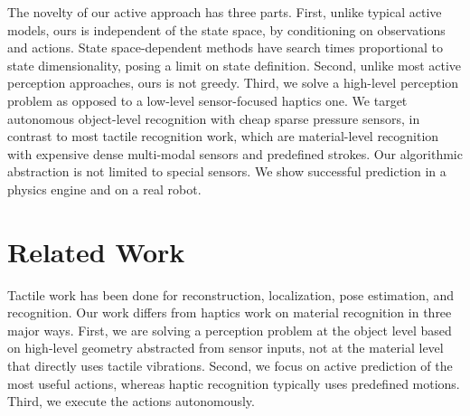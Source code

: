 \documentclass[letterpaper, 10 pt, conference]{ieeeconf}  %
\begin{document}
The novelty of our active approach has three parts. 
First, unlike typical active models, ours is independent of the state space, by conditioning on observations and actions. 
State space-dependent methods have search times proportional to state dimensionality, posing a limit on state definition.
Second, unlike most active perception approaches, ours is not greedy. %
Third, we solve a high-level perception problem as opposed to a low-level sensor-focused haptics one. We target autonomous object-level recognition with cheap sparse pressure sensors, in contrast to most tactile recognition work, which are material-level recognition with expensive dense multi-modal sensors and predefined strokes. Our algorithmic abstraction 
is not limited to special sensors.
%
We show successful prediction %
in a physics engine and on a real robot.


\section{Related Work}
\label{sec:related_work}





Tactile work has been done for reconstruction, localization, pose estimation, and recognition. %
Our work differs from haptics work on material recognition in three major ways. First, we are solving a perception problem at the object level based on high-level geometry abstracted from sensor inputs, not at the material level that directly uses tactile vibrations. Second, we focus on active prediction of the most useful actions, whereas haptic recognition typically uses predefined motions. Third, we execute the actions autonomously.
\end{document}
